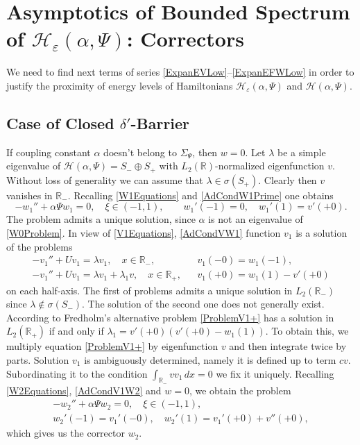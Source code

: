 \documentclass[11pt,english]{amsart}
\begin{document}
\section{Asymptotics of Bounded Spectrum of  $\mathcal{H_{\varepsilon}}(\alpha,\Psi)$: Correctors}\label{SectionCorrector}
We need to find  next terms of  series \eqref{ExpanEVLow}--\eqref{ExpanEFWLow} in order to justify
the proximity of  energy levels of Hamiltonians $\mathcal{H_{\varepsilon}}(\alpha,\Psi)$ and $\mathcal{H}(\alpha,\Psi)$.

\subsection{Case of Closed $\delta'$-Barrier}
If coupling constant $\alpha$ doesn't belong to $\Sigma_\Psi$, then $w=0$.
Let $\lambda $ be a simple eigenvalue of  $\mathcal{H}(\alpha,\Psi)=S_-\oplus S_+$ with  $L_2(\mathbb{R})$-normalized eigenfunction $v$. Without loss of generality
we can assume that $\lambda\in \sigma(S_+)$. Clearly then $v$ vanishes in $\mathbb{R}_-$. Recalling \eqref{W1Equations} and \eqref{AdCondW1Prime} one obtains
\begin{equation*}
-w_1''+\alpha\Psi w_1=0,\quad\xi\in(-1,1),\qquad
w_1'(-1)=0,\quad w_1'(1)=v'(+0).
\end{equation*}
The problem admits a unique solution, since $\alpha$ is not an eigenvalue of \eqref{W0Problem}.
In view of \eqref{V1Equations}, \eqref{AdCondVW1}  function $v_1$
is a solution of the problems
\begin{align}\label{ProblemV1-}
  &-v_1''+U v_1=\lambda v_1, \quad x\in \mathbb{R}_-,&&v_1(-0)=w_1(-1),\\\label{ProblemV1+}
  &-v_1''+U v_1=\lambda v_1+\lambda_1 v, \quad x\in \mathbb{R}_+, &&v_1(+0)=w_1(1)-v '(+0)&
\end{align}
 on each half-axis.
The first of problems admits a unique solution in $L_2(\mathbb{R}_-)$ since  $\lambda\not\in \sigma(S_-)$.
The solution of the second one does not generally exist.
According to Fredholm's alternative problem \eqref{ProblemV1+} has a solution in $L_2(\mathbb{R}_+)$ if and only if
$\lambda_1=v '(+0)(v '(+0)-w_1(1))$. To obtain this, we  multiply  equation \eqref{ProblemV1+} by eigenfunction $v$ and then integrate twice by parts.
Solution $v_1$ is ambiguously determined, namely it is defined up to term $cv$. Subordinating it to the condition
$\int_{\mathbb{R}_-}v v_1\,dx=0$ we fix it uniquely.
 Recalling \eqref{W2Equations}, \eqref{AdCondV1W2} and $w=0$,  we obtain the problem
\begin{equation}\label{ProblemW2}
\begin{gathered}
    -w_2''+\alpha\Psi w_2=0 ,\quad \xi\in(-1,1),\\[5pt]
   w_2'(-1)=v_1'(-0),\quad w_2'(1)=v_1'(+0)+v ''(+0),
   \end{gathered}
\end{equation}
which gives us the corrector $w_2$.
\end{document}
